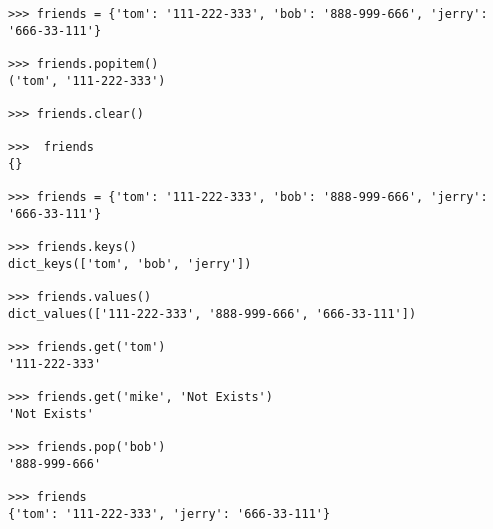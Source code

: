 \begin{lstlisting}
>>> friends = {'tom': '111-222-333', 'bob': '888-999-666', 'jerry': '666-33-111'}

>>> friends.popitem()
('tom', '111-222-333')

>>> friends.clear()

>>>  friends
{}

>>> friends = {'tom': '111-222-333', 'bob': '888-999-666', 'jerry': '666-33-111'}

>>> friends.keys()
dict_keys(['tom', 'bob', 'jerry'])

>>> friends.values()
dict_values(['111-222-333', '888-999-666', '666-33-111'])

>>> friends.get('tom')
'111-222-333'

>>> friends.get('mike', 'Not Exists')
'Not Exists'

>>> friends.pop('bob')
'888-999-666'

>>> friends
{'tom': '111-222-333', 'jerry': '666-33-111'}
\end{lstlisting}
